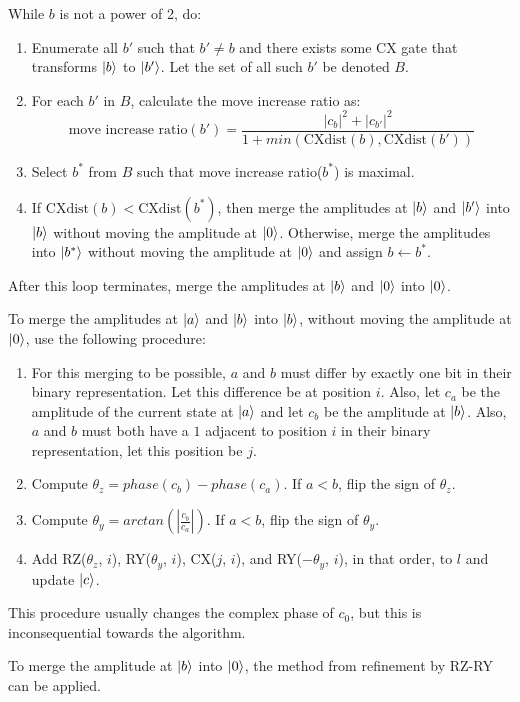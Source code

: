 \documentclass{article}
\begin{document}
While $b$ is not a power of 2, do:
\begin{enumerate}
	\item Enumerate all $b'$ such that $b' \neq b$ and there exists some CX gate that
		transforms $\mathinner{|{b}\rangle}$ to $\mathinner{|{b'}\rangle}$. Let the set of all such
		$b'$ be denoted $B$.
	\item For each $b'$ in $B$, calculate the move increase ratio as:
		$$\text{move increase ratio}(b')= \frac{|c_b|^2 + |c_{b'}|^2}{1 
        + min(\text{CXdist}(b), \text{CXdist}(b'))}$$
	\item Select $b^*$ from $B$ such that move increase ratio($b^*$) is
        maximal.
	\item If $\text{CXdist}(b) < \text{CXdist}(b^*)$, then merge the
		amplitudes at $\mathinner{|{b}\rangle}$ and $\mathinner{|{b'}\rangle}$ into $\mathinner{|{b}\rangle}$ without 
		moving the amplitude at $\mathinner{|{0}\rangle}$. Otherwise, merge the 
		amplitudes into $\mathinner{|{b^*}\rangle}$ without moving the amplitude at 
		$\mathinner{|{0}\rangle}$ and assign $b \leftarrow b^*$.
\end{enumerate}
After this loop terminates, merge the amplitudes at $\mathinner{|{b}\rangle}$ and $\mathinner{|{0}\rangle}$ 
into $\mathinner{|{0}\rangle}$.

To merge the amplitudes at $\mathinner{|{a}\rangle}$ and $\mathinner{|{b}\rangle}$ into $\mathinner{|{b}\rangle}$, without
moving the amplitude at $\mathinner{|{0}\rangle}$, use the following procedure:
\begin{enumerate}
	\item For this merging to be possible, $a$ and $b$ must differ by
		exactly one bit in their binary representation. Let this
		difference be at position $i$. Also, let $c_a$ be the amplitude
		of the current state at $\mathinner{|{a}\rangle}$ and let $c_b$ be the amplitude
		at $\mathinner{|{b}\rangle}$. Also, $a$ and $b$ must both have a $1$ adjacent to
		position $i$ in their binary representation, let this position
		be $j$.
	\item Compute $\theta_z = phase(c_b) - phase(c_a)$. If $a < b$, flip the
		sign of $\theta_z$.
	\item Compute $\theta_y = arctan(|\frac{c_b}{c_a}|)$. If $a < b$, flip
		the sign of $\theta_y$.
	\item Add RZ($\theta_z$, $i$), RY($\theta_y$, $i$), CX($j$, $i$), and
		RY($-\theta_y$, $i$), in that order, to $l$ and update 
		$\mathinner{|{c}\rangle}$.
\end{enumerate}
This procedure usually changes the complex phase of $c_0$, but this is
inconsequential towards the algorithm.

To merge the amplitude at $\mathinner{|{b}\rangle}$ into $\mathinner{|{0}\rangle}$, the method from refinement
by RZ-RY can be applied.
\end{document}
